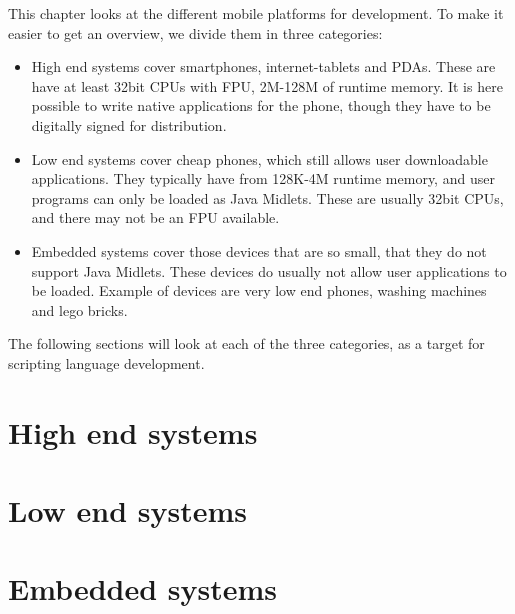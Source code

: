 This chapter looks at the different mobile platforms for development.
To make it easier to get an overview, we divide them in three categories:
\begin{itemize}
\item{High end systems} cover smartphones, internet-tablets and PDAs.
These are have at least 32bit CPUs with FPU, 2M-128M of runtime memory.
It is here possible to write native applications for the phone, 
though they have to be digitally signed for distribution.

\item{Low end systems}
cover cheap phones, which still allows user downloadable applications. 
They typically have from 128K-4M runtime memory, 
and user programs can only be loaded as Java Midlets.
These are usually 32bit CPUs, and there may not be an FPU available. 

\item{Embedded systems}
cover those devices that are so small, that they do not support Java Midlets.
These devices do usually not allow user applications to be loaded.
Example of devices are very low end phones, washing machines and lego bricks.

\end{itemize}

The following sections will look at each of the three categories,
as a target for scripting language development. 

\section{High end systems}
\section{Low end systems}
\section{Embedded systems}


